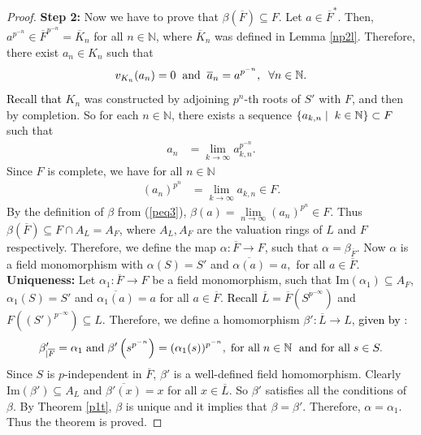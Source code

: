 \documentclass[times,10pt]{amsart}
\newcommand{\N}{\ensuremath{\mathbb{N}}}
\begin{document}
{\begin{proof}
     \textbf{Step 2:}
     Now we  have to prove that $ \beta(\overline{F})\subseteq F.$   Let $a\in \overline{F}^*.$
     Then, $ a^{p^{-n}}\in \overline{F}^{p^{-n}}=\overline{K}_n$ for all $n\in \mathbb{N}$, where  $\overline{K}_n$ was defined in  Lemma \ref{np2l}. Therefore,   there exist $a_n\in K_n$ such that$$ v_{K_n}(a_n)= 0\hspace{2mm} \text{and}\hspace{2mm}\overline{a}_n= a^{p^{-n}},\hspace{2mm}\forall n\in \N.$$  \textcolor{black}{Recall} \textcolor{black}{that} $K_n$ was constructed by adjoining $p^n$-th roots of $S'$ with $F$, and  then by completion. So for each $n\in \N$, there exists  a sequence $\{a_{k,n}\mid\hspace{1mm}k\in \N\}\subset F$ such that\begin{align*}  a_n&=\lim_{ k\to \infty}a_{k,n}^{p^{-n}}.\end{align*}Since $F$ is complete, we have for all $n\in \N$\begin{align*}(a_n)^{p^n}&= \lim_{k\to \infty} a_{k,n}\in F.\end{align*}    By the definition of $\beta$ from (\ref{peq3}),\hspace{2mm} $\beta(a)=\underset{n\to \infty}{\lim} (a_n)^{p^n}\in F. $ Thus $\beta(\overline{F})\subseteq F\cap A_L= A_F$, where $A_L,A_F$ are the valuation rings of $L$ and $F$ respectively. Therefore, we define the map $\alpha: \overline{F}\xrightarrow{} F$, such that  $\alpha= \beta_{ \overline{F}}.$ Now  $ \alpha$ is  a field monomorphism with   $ \alpha(S)=S'$ and $\overline{ \alpha(a)}=a, $ for all $a\in \overline{F} $. \\



\textbf{ Uniqueness:} Let   $\alpha_1: \overline{F}\xrightarrow{} F$ be a field monomorphism, such that Im$(\alpha_1)\subseteq A_F$, $\alpha_1(S)= S'$ and $\overline{\alpha_1(a)}= a$ for all $a\in \overline{F}.$ \textcolor{black}{Recall}  $\overline{L}= \overline{F}\left(S^{p^{-\infty}}\right)$ and $F\left((S')^{p^{-\infty}}\right)\subseteq L.$  Therefore, we  define a homomorphism $\beta': \overline{L} \xrightarrow{} L$,  \textcolor{black}{given by}  :$$ \beta'_{| \overline{F}}= \alpha_1\hspace{1mm} \text{and} \hspace{1mm} \beta'\left(s^{p^{-n}}\right)= (\alpha_1(s))^{p^{-n}},\hspace{1mm} \text{for all}\hspace{1mm} n\in \N \hspace{1mm}\text{ and for all}\hspace{1mm} s\in S.$$  Since $S$ is $p$-independent in $\overline{F}$, 
 $\beta'$ is a well-defined field homomorphism.  Clearly  Im$(\beta') \subseteq A_L$ and $ \overline{\beta'(x)}=x$ for all $x\in \overline{L}.$ So $\beta'$ satisfies  all the  conditions of $\beta$. By Theorem \ref{p1t}, $\beta$ is unique and it implies that  $\beta=\beta'$. Therefore,   $\alpha=\alpha_1.$ Thus the theorem is proved.    
 \end{proof}
 
}
\end{document}

